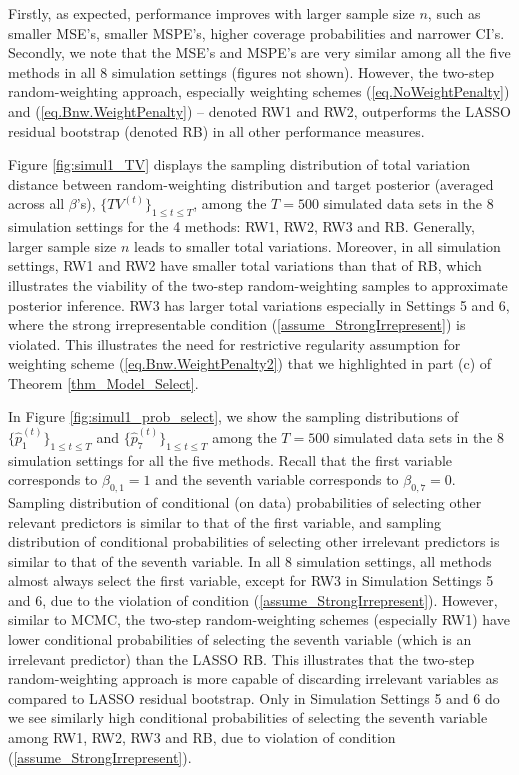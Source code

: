 \documentclass[ejs,authoryear,linksfromyear]{imsart}
\numberwithin{equation}{section}
\theoremstyle{plain}
\begin{document}
Firstly, as expected, performance improves with larger sample size $n$, such as smaller MSE's, smaller MSPE's, higher coverage probabilities and narrower CI's.  Secondly, we note that the MSE's and MSPE's are very similar among all the five methods in all 8 simulation settings (figures not shown). However, the two-step random-weighting approach, especially weighting schemes (\ref{eq.NoWeightPenalty}) and (\ref{eq.Bnw.WeightPenalty}) -- denoted RW1 and RW2, outperforms the LASSO residual bootstrap (denoted RB) in all other performance measures.


Figure \ref{fig:simul1_TV} displays the sampling distribution of total variation distance between random-weighting distribution and target posterior (averaged across all $\beta$'s),  $\{TV^{(t)}\}_{1 \leq t \leq T}$, among the $T=500$ simulated data sets in the 8 simulation settings for the 4 methods: RW1, RW2, RW3 and RB. Generally, larger sample size $n$ leads to smaller total variations. Moreover, in all simulation settings, RW1 and RW2 have smaller total variations than that of RB, which illustrates the viability of the two-step random-weighting samples to approximate posterior inference. RW3 has larger total variations especially in Settings 5 and 6, where the strong irrepresentable condition (\ref{assume_StrongIrrepresent}) is violated. This illustrates the need for restrictive regularity assumption for weighting scheme (\ref{eq.Bnw.WeightPenalty2}) that we highlighted in part (c) of Theorem \ref{thm_Model_Select}.     

In Figure \ref{fig:simul1_prob_select}, we show the sampling distributions of $\big\{ \hat{p}_1^{(t)} \big\}_{1 \leq t \leq T}$ and $\big\{ \hat{p}_7^{(t)} \big\}_{1 \leq t \leq T}$ among the $T=500$ simulated data sets in the 8 simulation settings for all the five methods. Recall that the first variable corresponds to $\beta_{0,1} = 1$ and the seventh variable corresponds to $\beta_{0,7} = 0$. Sampling distribution of conditional (on data) probabilities of selecting other relevant predictors is similar to that of the first variable, and sampling distribution of conditional  probabilities of selecting other irrelevant predictors is similar to that of the seventh variable. In all 8 simulation settings, all methods almost always select the first variable, except for RW3 in Simulation Settings 5 and 6, due to the violation of condition (\ref{assume_StrongIrrepresent}). However, similar to MCMC, the two-step random-weighting schemes (especially RW1) have lower conditional  probabilities of selecting the seventh variable (which is an irrelevant predictor) than the LASSO RB. This illustrates that the two-step random-weighting approach is more capable of discarding irrelevant variables as compared to LASSO residual bootstrap. Only in Simulation Settings 5 and 6 do we see similarly high conditional  probabilities of selecting the seventh variable among RW1, RW2, RW3 and RB, due to violation of condition (\ref{assume_StrongIrrepresent}).
\end{document}
